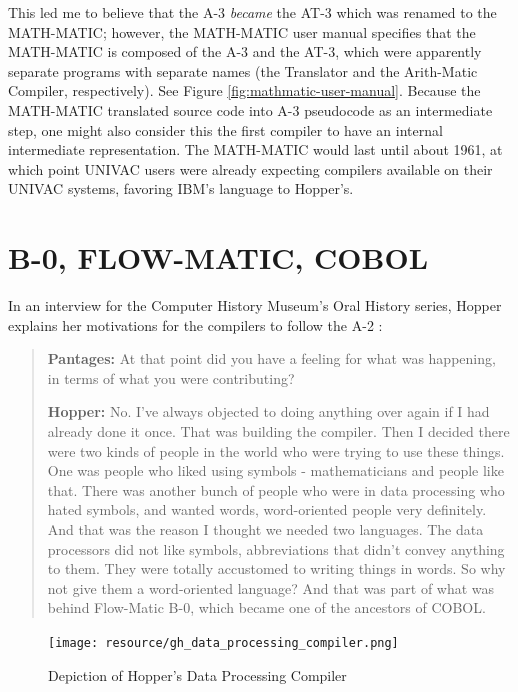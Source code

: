 This led me to believe that the A-3 \textit{became} the AT-3 which was
renamed to the MATH-MATIC; however, the MATH-MATIC user manual
\cite{ash_etal_1957_math-matic_manual} specifies that the MATH-MATIC
is composed of the A-3 and the AT-3, which were apparently separate
programs with separate names (the Translator and the Arith-Matic Compiler,
respectively).
See Figure \ref{fig:mathmatic-user-manual}.
Because the MATH-MATIC translated source code into A-3 pseudocode
as an intermediate step, one might also consider this the first compiler
to have an internal intermediate representation.
The MATH-MATIC would last until about 1961, at which point UNIVAC users
were already expecting \FTN{} compilers available on their UNIVAC systems,
favoring IBM's language to Hopper's.

\section{B-0, FLOW-MATIC, COBOL}

In an interview for the Computer History Museum's Oral History series,
Hopper explains her motivations for the compilers to follow the A-2
\cite{Hopper_1980_Oral_History}:

\begin{quotation}
  \textbf{Pantages:} At that point did you have a feeling for what was 
happening, in terms of what you were contributing?

  \textbf{Hopper:} No. I've always objected to doing anything over again if I had 
already done it once. That was building the compiler. Then I decided there were 
two kinds of people in the world who were trying to use these things. One was 
people who liked using symbols - mathematicians and people like that. There was 
another bunch of people who were in data processing who hated symbols, and 
wanted words, word-oriented people very definitely. And that was the reason I 
thought we needed two languages.  The data processors did not like symbols, 
abbreviations that didn't convey anything to them.  They were totally 
accustomed to writing things in words. So why not give them a word-oriented 
language? And that was part of what was behind Flow-Matic B-0, which became one 
of the ancestors of COBOL.
\end{quotation}

\begin{figure}
    \centering
    \texttt{[image: resource/gh\_data\_processing\_compiler.png]}
    \caption{Depiction of Hopper's Data Processing Compiler\cite{hopper_1955_preliminary_definitions_data_processing_compiler}}
    \label{fig:data-processing-compiler}
\end{figure}

